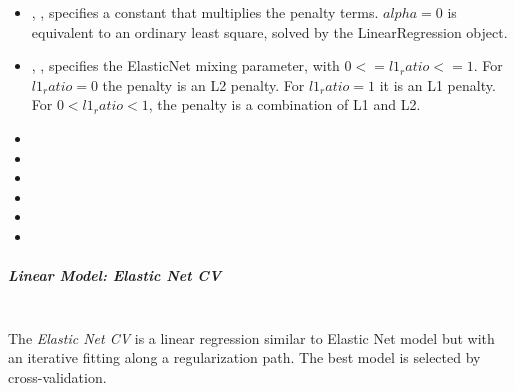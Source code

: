 \begin{itemize}
  \item {}, , specifies a constant
  that multiplies the penalty terms.
  $alpha = 0$ is equivalent to an ordinary least square, solved by the
  LinearRegression object.
  \item {}, , specifies the
  ElasticNet mixing parameter, with $0 <= l1_ratio <= 1$.
  For $l1_ratio = 0$ the penalty is an L2 penalty.
  For $l1_ratio = 1$ it is an L1 penalty.
  For $0 < l1_ratio < 1$, the penalty is a combination of L1 and L2.
  \item {}
  \item {}
  \item {}
  \item {}
  \item {}
  \item {}
\end{itemize}
\subparagraph{Linear Model: Elastic Net CV}
\mbox{}
\\The \textit{Elastic Net CV} is a linear regression similar to Elastic Net
model but with an iterative fitting along a regularization path.
%
The best model is selected by cross-validation.
%

